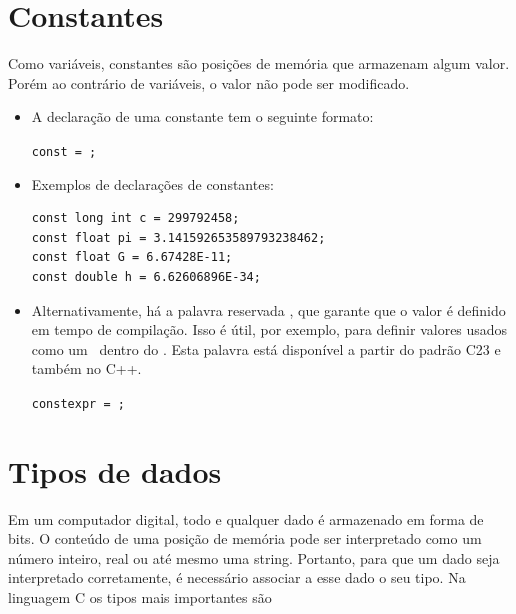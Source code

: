 \section{Constantes}

Como variáveis, constantes são posições de memória que armazenam algum valor. Porém ao contrário de variáveis, o valor não pode ser modificado.

\begin{itemize}

\item A declaração de uma constante tem o seguinte formato:

{\tt const   = ;}

\item Exemplos de declarações de constantes:
\begin{lstlisting}
const long int c = 299792458;
const float pi = 3.141592653589793238462;
const float G = 6.67428E-11;
const double h = 6.62606896E-34;
\end{lstlisting}

\item Alternativamente, há a palavra reservada \CONSTEXPR, que garante que o valor é definido em tempo de compilação. Isso é útil, por exemplo, para definir valores usados como um \CASE\ dentro do \SWITCH. Esta palavra está disponível a partir do padrão C23 e também no C++.

{\tt constexpr   = ;}

\end{itemize}


\section{Tipos de dados}

Em um computador digital, todo e qualquer dado é armazenado em forma de bits. O conteúdo de uma posição de memória pode ser interpretado como um número inteiro, real ou até mesmo uma string. Portanto, para que um dado seja interpretado corretamente, é necessário associar a esse dado o seu tipo. Na linguagem C os tipos mais importantes são

